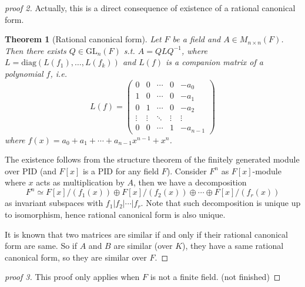 \documentclass{article}
\newtheorem{theorem}{Theorem}
\begin{document}
\begin{proof}[proof 2]
Actually, this is a direct consequence of existence of a rational canonical form. 
\begin{theorem}[Rational canonical form]
Let $F$ be a field and $A\in M_{n\times n}(F)$. Then there exists $Q\in \mathrm{GL}_{n}(F)$ s.t. $A = QLQ^{-1}$, where $L = \mathrm{diag}(L(f_{1}), \dots, L(f_{k}))$ and $L(f)$ is a companion matrix of a polynomial $f$, i.e. 
$$
L(f) = \begin{pmatrix} 0 & 0 & \cdots & 0 & -a_{0} \\ 1 & 0 & \cdots & 0 & -a_{1} \\ 
0 & 1 & \cdots & 0 & -a_{2} \\ \vdots & \vdots & \ddots & \vdots & \vdots \\ 
0 & 0 & \cdots & 1 & -a_{n-1}\end{pmatrix}
$$
where $f(x) = a_{0} + a_{1} + \cdots + a_{n-1}x^{n-1} + x^{n}$. 
\end{theorem}
The existence follows from the structure theorem of the finitely generated module over PID (and $F[x]$ is a PID for any field $F$). Consider $F^{n}$ as $F[x]$-module where $x$ acts as multiplication by $A$, then we have a decomposition
$$
F^{n} \simeq F[x]/(f_{1}(x))\oplus F[x]/(f_{2}(x))\oplus\cdots\oplus F[x]/(f_{r}(x))
$$
as invariant subspaces with $f_{1}|f_{2}|\cdots |f_{r}$. Note that such decomposition is unique up to isomorphism, hence rational canonical form is also unique. 

It is known that two matrices are similar if and only if their rational canonical form are same. So if $A$ and $B$ are similar (over $K$), they have a same rational canonical form, so they are similar over $F$. 
\end{proof}

\begin{proof}[proof 3]
This proof only applies when $F$ is not a finite field. (not finished)
\end{proof}
\end{document}
